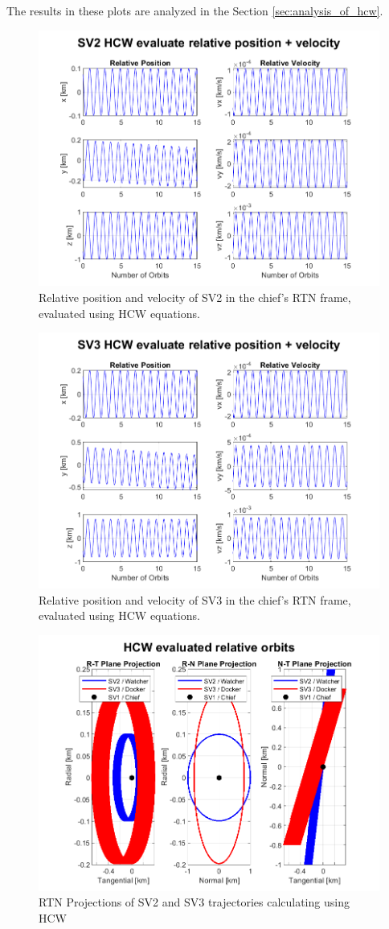 The results in these plots are analyzed in the Section \ref{sec:analysis_of_hcw}.

\begin{figure}[htpb]
    \centering
    \includegraphics[width=0.7\linewidth]{sim/figures/PS3/HCW_pos_vel_SV2.png}
    \caption{Relative position and velocity of SV2 in the chief's RTN frame, evaluated using HCW equations.}
    \label{fig:hcw_sv2_pos_vel}
\end{figure}

\begin{figure}[htpb]
    \centering
    \includegraphics[width=0.7\linewidth]{sim/figures/PS3/HCW_pos_vel_SV3.png}
    \caption{Relative position and velocity of SV3 in the chief's RTN frame, evaluated using HCW equations.}
    \label{fig:hcw_sv2_pos_vel}
\end{figure}

\begin{figure}[htpb]
    \centering
    \includegraphics[width=0.7\linewidth]{sim/figures/PS3/RTN_projections_HCW.png}
    \caption{RTN Projections of SV2 and SV3 trajectories calculating using HCW}
    \label{fig:hcw_projections}
\end{figure}

